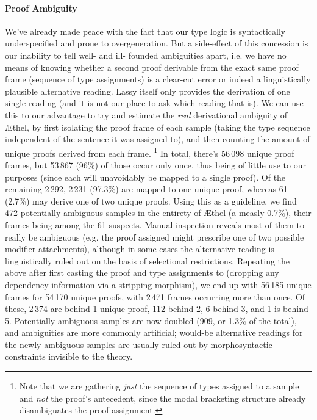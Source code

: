 \paragraph{Proof Ambiguity}
We've already made peace with the fact that our type logic is syntactically underspecified and prone to overgeneration.
But a side-effect of this concession is our inability to tell well- and ill- founded ambiguities apart, i.e. we have no means of knowing whether a second proof derivable from the exact same proof frame (sequence of type assignments) is a clear-cut error or indeed a linguistically plausible alternative reading.
Lassy itself only provides the derivation of one single reading (and it is not our place to ask which reading that is).
We can use this to our advantage to try and estimate the \textit{real} derivational ambiguity of \AE thel, by first isolating the proof frame of each sample (taking the type sequence independent of the sentence it was assigned to), and then counting the amount of unique proofs derived from each frame.%
	\footnote{Note that we are gathering \textit{just} the sequence of types assigned to a sample and \textit{not} the proof's antecedent, since the modal bracketing structure already disambiguates the proof assignment.}
In total, there's 56\,098 unique proof frames, but 53\,867 (96\%) of those occur only once, thus being of little use to our purposes (since each will unavoidably be mapped to a single proof).
Of the remaining 2\,292, 2\,231 (97.3\%) are mapped to one unique proof, whereas 61 (2.7\%) may derive one of two unique proofs.
Using this as a guideline, we find 472 potentially ambiguous samples in the entirety of \AE thel (a measly 0.7\%), their frames being among the 61 suspects.
Manual inspection reveals most of them to really be ambiguous (e.g. the proof assigned might prescribe one of two possible modifier attachments), 
although in some cases the alternative reading is linguistically ruled out on the basis of selectional restrictions.
Repeating the above after first casting the proof and type assignments to \LP{} (dropping any dependency information via a stripping morphism), we end up with 56\,185 unique frames for 54\,170 unique proofs, with 2\,471 frames occurring more than once.
Of these, 2\,374 are behind 1 unique proof, 112 behind 2, 6 behind 3, and 1 is behind 5.
Potentially ambiguous samples are now doubled (909, or 1.3\% of the total), and ambiguities are more commonly artificial; would-be alternative readings for the newly ambiguous samples are usually ruled out by morphosyntactic constraints invisible to the theory.

